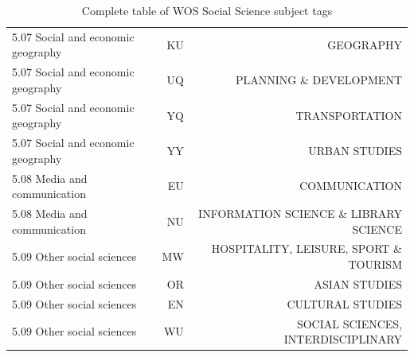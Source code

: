 \documentclass[12pt, a4paper]{article}
\begin{document}
\begin{table}[h]
\begin{adjustbox}{center}
\begin{tabular}{l|rr}
			5.07 Social and economic geography & KU & GEOGRAPHY                                 \\
			5.07 Social and economic geography & UQ & PLANNING \& DEVELOPMENT                   \\
			5.07 Social and economic geography & YQ & TRANSPORTATION                            \\
			5.07 Social and economic geography & YY & URBAN STUDIES                             \\
			5.08 Media and communication       & EU & COMMUNICATION                             \\
			5.08 Media and communication       & NU & INFORMATION SCIENCE \& LIBRARY SCIENCE    \\
			5.09 Other social sciences         & MW & HOSPITALITY, LEISURE, SPORT \& TOURISM    \\
			5.09 Other social sciences         & OR & ASIAN STUDIES                             \\
			5.09 Other social sciences         & EN & CULTURAL STUDIES                          \\
			5.09 Other social sciences         & WU & SOCIAL SCIENCES, INTERDISCIPLINARY    \\
			\bottomrule
		\end{tabular}
	\end{adjustbox}
	\caption{Complete table of WOS Social Science subject tags}\label{sum_1}
\end{table}
\end{document}

